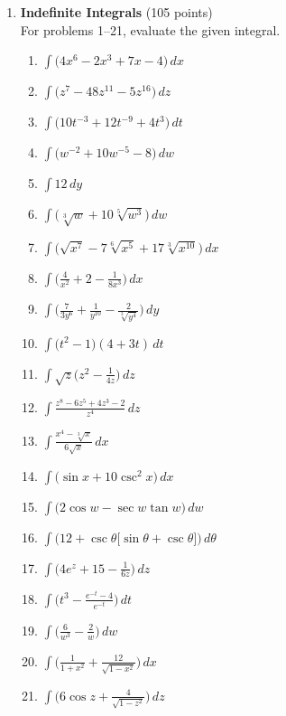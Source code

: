 \begin{enumerate}
  \item \textbf{Indefinite Integrals} (105 points)\\
  For problems 1--21, evaluate the given integral.
  \begin{enumerate}
    \item $\displaystyle \int \bigl(4 x^6 - 2 x^3 + 7 x - 4\bigr) \,dx$
    \item $\displaystyle \int \bigl(z^7 - 48 z^{11} - 5 z^{16}\bigr) \,dz$
    \item $\displaystyle \int \bigl(10 t^{-3} + 12 t^{-9} + 4 t^3\bigr) \,dt$
    \item $\displaystyle \int \bigl(w^{-2} + 10 w^{-5} - 8\bigr) \,dw$
    \item $\displaystyle \int 12 \,dy$
    \item $\displaystyle \int \bigl(\sqrt[3]{w} + 10 \sqrt[5]{w^3}\bigr) \,dw$
    \item $\displaystyle \int \bigl(\sqrt{x^7} - 7 \sqrt[6]{x^5} + 17 \sqrt[3]{x^{10}}\bigr) \,dx$
    \item $\displaystyle \int \biggl(\frac{4}{x^2} + 2 - \frac{1}{8 x^3}\biggr) \,dx$
    \item $\displaystyle \int \biggl(\frac{7}{3 y^6} + \frac{1}{y^{10}} - \frac{2}{\sqrt[3]{y^4}}\biggr) \,dy$
    \item $\displaystyle \int \bigl(t^2 - 1\bigr)(4 + 3 t) \,dt$
    \item $\displaystyle \int \sqrt{z}\biggl(z^2 - \frac{1}{4 z}\biggr) \,dz$
    \item $\displaystyle \int \frac{z^8 - 6 z^5 + 4 z^3 - 2}{z^4} \,dz$
    \item $\displaystyle \int \frac{x^4 - \sqrt[3]{x}}{6 \sqrt{x}} \,dx$
    \item $\displaystyle \int \bigl(\sin x + 10 \csc^2 x\bigr) \,dx$
    \item $\displaystyle \int \bigl(2 \cos w - \sec w \tan w\bigr) \,dw$
    \item $\displaystyle \int \bigl(12 + \csc \theta\bigl[\sin \theta + \csc \theta\bigr]\bigr) \,d\theta$
    \item $\displaystyle \int \biggl(4 e^z + 15 - \frac{1}{6 z}\biggr) \,dz$
    \item $\displaystyle \int \biggl(t^3 - \frac{e^{-t} - 4}{e^{-t}}\biggr) \,dt$
    \item $\displaystyle \int \biggl(\frac{6}{w^3} - \frac{2}{w}\biggr) \,dw$
    \item $\displaystyle \int \biggl(\frac{1}{1 + x^2} + \frac{12}{\sqrt{1 - x^2}}\biggr) \,dx$
    \item $\displaystyle \int \biggl(6 \cos z + \frac{4}{\sqrt{1 - z^2}}\biggr) \,dz$
  \end{enumerate}


\end{enumerate}

